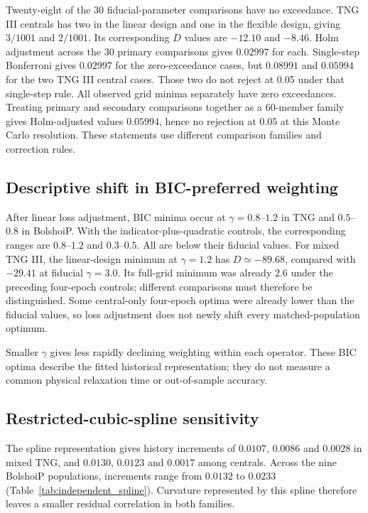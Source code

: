 \documentclass[11pt,a4paper]{article}
\begin{document}
Twenty-eight of the 30 fiducial-parameter comparisons have no exceedance. TNG III centrals has two in the linear design and one in the flexible design, giving $3/1001$ and $2/1001$. Its corresponding $D$ values are $-12.10$ and $-8.46$. Holm adjustment across the 30 primary comparisons gives $0.02997$ for each. Single-step Bonferroni gives $0.02997$ for the zero-exceedance cases, but $0.08991$ and $0.05994$ for the two TNG III central cases. Those two do not reject at 0.05 under that single-step rule. All observed grid minima separately have zero exceedances. Treating primary and secondary comparisons together as a 60-member family gives Holm-adjusted values $0.05994$, hence no rejection at 0.05 at this Monte Carlo resolution. These statements use different comparison families and correction rules.

\subsection{Descriptive shift in BIC-preferred weighting}
After linear loss adjustment, BIC minima occur at $\gamma=0.8$--$1.2$ in TNG and $0.5$--$0.8$ in BolshoiP. With the indicator-plus-quadratic controls, the corresponding ranges are $0.8$--$1.2$ and $0.3$--$0.5$. All are below their fiducial values. For mixed TNG III, the linear-design minimum at $\gamma=1.2$ has $D\simeq-89.68$, compared with $-29.41$ at fiducial $\gamma=3.0$. Its full-grid minimum was already $2.6$ under the preceding four-epoch controls; different comparisons must therefore be distinguished. Some central-only four-epoch optima were already lower than the fiducial values, so loss adjustment does not newly shift every matched-population optimum.

Smaller $\gamma$ gives less rapidly declining weighting within each operator. These BIC optima describe the fitted historical representation; they do not measure a common physical relaxation time or out-of-sample accuracy.

\subsection{Restricted-cubic-spline sensitivity}\label{sec:spline}
The spline representation gives history increments of $0.0107$, $0.0086$ and $0.0028$ in mixed TNG, and $0.0130$, $0.0123$ and $0.0017$ among centrals. Across the nine BolshoiP populations, increments range from $0.0132$ to $0.0233$ (Table~\ref{tab:independent_spline}). Curvature represented by this spline therefore leaves a smaller residual correlation in both families.
\end{document}
